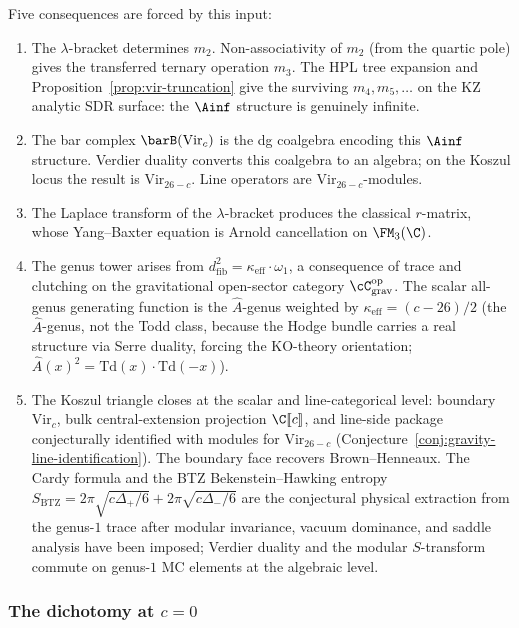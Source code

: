Five consequences are forced by this input:
\begin{enumerate}[label=\textup{(\Roman*)}]
\item The $\lambda$-bracket determines $m_2$. Non-associativity
 of $m_2$ (from the quartic pole) gives the transferred
 ternary operation $m_3$. The HPL tree expansion and
 Proposition~\ref{prop:vir-truncation} give the surviving
 $m_4,m_5,\ldots$ on the KZ analytic SDR surface: the $\Ainf$
 structure is genuinely infinite.
\item The bar complex $\barB(\mathrm{Vir}_c)$ is the dg coalgebra
 encoding this $\Ainf$ structure. Verdier duality converts
 this coalgebra to an algebra; on the Koszul locus the
 result is $\mathrm{Vir}_{26-c}$. Line operators are
 $\mathrm{Vir}_{26-c}$-modules.
\item The Laplace transform of the $\lambda$-bracket produces
 the classical $r$-matrix, whose Yang--Baxter equation is Arnold
 cancellation on $\FM_3(\C)$.
\item The genus tower arises from
 $d_{\mathrm{fib}}^2 = \kappa_{\mathrm{eff}}\cdot\omega_1$,
 a consequence of trace and clutching on the gravitational
 open-sector category $\cC_{\mathrm{grav}}^{\mathrm{op}}$.
 The scalar all-genus generating function is the
 $\hat A$-genus weighted by $\kappa_{\mathrm{eff}} = (c-26)/2$
 (the $\hat{A}$-genus, not the Todd class, because the Hodge
 bundle carries a real structure via Serre duality, forcing the
 KO-theory orientation; $\hat{A}(x)^2 = \mathrm{Td}(x)\cdot
 \mathrm{Td}(-x)$).
\item The Koszul triangle closes at the scalar and line-categorical
 level: boundary
 $\mathrm{Vir}_c$, bulk central-extension projection $\C[\![c]\!]$,
 and line-side package
 conjecturally identified with modules for
 $\mathrm{Vir}_{26-c}$
 (Conjecture~\ref{conj:gravity-line-identification}). The
 boundary face recovers Brown--Henneaux. The Cardy formula
 and the BTZ Bekenstein--Hawking entropy
 $S_{\mathrm{BTZ}} =
 2\pi\sqrt{c\Delta_+/6} + 2\pi\sqrt{c\Delta_-/6}$ are the
 conjectural physical extraction from the genus-$1$ trace after
 modular invariance, vacuum dominance, and saddle analysis have
 been imposed; Verdier duality and the modular $S$-transform
 commute on genus-$1$ MC elements at the algebraic level.
\end{enumerate}

\subsubsection*{The dichotomy at $c = 0$}

